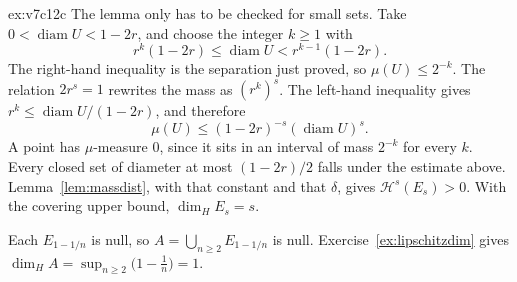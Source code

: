 \begin{solution}{ex:v7c12c}
The lemma only has to be checked for small sets. Take $0<\operatorname{diam}U<1-2r$, and choose the integer $k\ge 1$ with
\[r^{k}(1-2r)\le\operatorname{diam}U<r^{k-1}(1-2r).\]
The right-hand inequality is the separation just proved, so $\mu(U)\le 2^{-k}$. The relation $2r^s=1$ rewrites the mass as $(r^k)^s$. The
left-hand inequality gives $r^k\le\operatorname{diam}U/(1-2r)$, and therefore
\[\mu(U)\le(1-2r)^{-s}(\operatorname{diam}U)^s.\]
A point has $\mu$-measure $0$, since it sits in an interval of mass $2^{-k}$ for every $k$. Every closed set of diameter at most $(1-2r)/2$
falls under the estimate above. Lemma~\ref{lem:massdist}, with that constant and that $\delta$, gives $\mathcal H^s(E_s)>0$. With the covering
upper bound, $\dim_H E_s=s$.

Each $E_{1-1/n}$ is null, so $A=\bigcup_{n\ge 2}E_{1-1/n}$ is null. Exercise~\ref{ex:lipschitzdim} gives
$\dim_H A=\sup_{n\ge 2}\bigl(1-\frac1n\bigr)=1$.
\end{solution}

